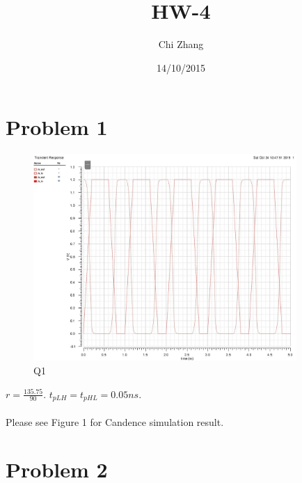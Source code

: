 \documentclass[a4paper,10pt]{article}
\title{HW-4}
\author{Chi Zhang}
\date{14/10/2015}
\begin{document}
\maketitle
\section*{Problem 1}
\begin{figure}
 \centering
 \includegraphics[width=10cm]{HW4_Q1.jpg}
 \caption{Q1}
\end{figure}
\begin{math}r = \frac{135.75}{90}\end{math}. \begin{math}t_{pLH} = t_{pHL} = 0.05ns\end{math}.\\
\\
Please see Figure 1 for Candence simulation result.
\section*{Problem 2}
\end{document}
